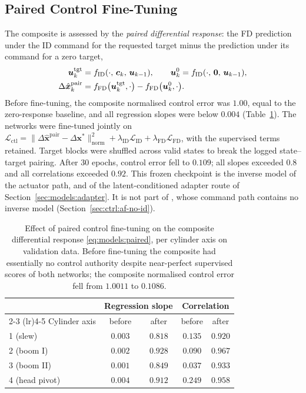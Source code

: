 \subsection{Paired Control Fine-Tuning}
\label{sec:models:id-paired}

The composite is assessed by the \emph{paired differential response}: the FD
prediction under the ID command for the requested target minus the prediction
under its command for a zero target,
%
\begin{align}
  \bm{u}^{\mathrm{tgt}}_k &= f_{\mathrm{ID}}(\cdot,\, \bm{c}_k,\, \bm{u}_{k-1}),
  \qquad
  \bm{u}^{0}_k = f_{\mathrm{ID}}(\cdot,\, \bm{0},\, \bm{u}_{k-1}), \notag \\
  \Delta\hat{\bm{x}}^{\mathrm{pair}}_k &=
    f_{\mathrm{FD}}\bigl(\bm{u}^{\mathrm{tgt}}_k, \cdot\bigr)
  - f_{\mathrm{FD}}\bigl(\bm{u}^{0}_k, \cdot\bigr).
  \label{eq:models:paired}
\end{align}
%
Before fine-tuning, the composite normalised control error was $1.00$, equal to
the zero-response baseline, and all regression slopes were below $0.004$
(Table~\ref{tab:models:paired}). The networks were fine-tuned jointly on
$\mathcal{L}_{\mathrm{ctl}} = \| \Delta\hat{\bm{x}}^{\mathrm{pair}}
- \Delta\bm{x}^{*} \|^2_{\mathrm{norm}}
+ \lambda_{\mathrm{ID}}\mathcal{L}_{\mathrm{ID}}
+ \lambda_{\mathrm{FD}}\mathcal{L}_{\mathrm{FD}}$,
with the supervised terms retained. Target blocks were shuffled across valid
states to break the logged state--target pairing. After 30 epochs, control
error fell to $0.109$; all slopes exceeded $0.8$ and all correlations exceeded
$0.92$. This frozen checkpoint is the inverse model of the \ppoIDFD{} actuator
path, and of the latent-conditioned adapter route of
Section~\ref{sec:models:adapter}. It is not part of \ppoAAMFD, whose command
path contains no inverse model (Section~\ref{sec:ctrl:af-no-id}).

\begin{table}[H]
  \centering
  \caption{Effect of paired control fine-tuning on the composite differential
  response \eqref{eq:models:paired}, per cylinder axis on validation data.
  Before fine-tuning the composite had essentially no control authority despite
  near-perfect supervised scores of both networks; the composite normalised
  control error fell from $1.0011$ to $0.1086$.}
  \label{tab:models:paired}
  \begin{tabular}{lcccc}
    \toprule
    & \multicolumn{2}{c}{Regression slope}
    & \multicolumn{2}{c}{Correlation} \\
    \cmidrule(lr){2-3} \cmidrule(lr){4-5}
    Cylinder axis & before & after & before & after \\
    \midrule
    1 (slew)      & $0.003$ & $0.818$ & $0.135$ & $0.920$ \\
    2 (boom I)    & $0.002$ & $0.928$ & $0.090$ & $0.967$ \\
    3 (boom II)   & $0.001$ & $0.849$ & $0.037$ & $0.933$ \\
    4 (head pivot)& $0.004$ & $0.912$ & $0.249$ & $0.958$ \\
    \bottomrule
  \end{tabular}
\end{table}

